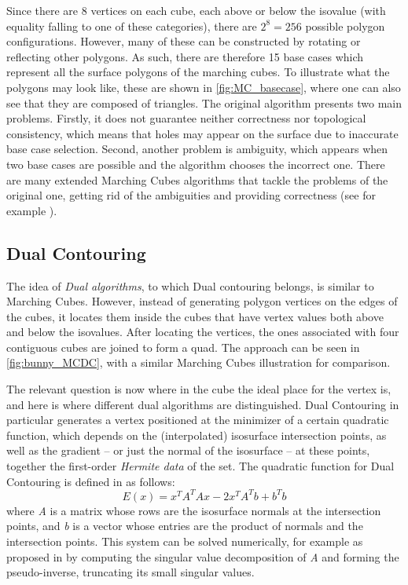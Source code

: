 Since there are 8 vertices on each cube, each above or below the isovalue (with equality falling to one of these categories), there are $2^8=256$ possible polygon configurations. However, many of these can be constructed by rotating or reflecting other polygons. As such, there are therefore 15 base cases which represent all the surface polygons of the marching cubes. To illustrate what the polygons may look like, these are shown in \autoref{fig:MC_basecase}, where one can also see that they are composed of triangles. 
The original algorithm presents two main problems. Firstly, it does not guarantee neither
correctness nor topological consistency, which means that holes may appear on the surface due
to inaccurate base case selection. Second, another problem is ambiguity, which appears when two
base cases are possible and the algorithm chooses the incorrect one. There are many extended Marching Cubes
algorithms that tackle the problems of the original one, getting rid of the ambiguities and
providing correctness (see for example \cite{ExtendedMC}).

\subsection{Dual Contouring}
The idea of \emph{Dual algorithms}, to which Dual contouring belongs, is similar to Marching Cubes. However, instead of generating polygon vertices on the
edges of the cubes, it locates them inside the cubes that have vertex values both above and below the isovalues.
After locating the vertices, the ones associated with four contiguous cubes are joined to form a quad. The approach can be seen in \autoref{fig:bunny_MCDC}, with a similar Marching Cubes illustration for comparison. 

The relevant question is now where in the cube the ideal place for the vertex is, and here is where different dual algorithms are distinguished. Dual Contouring in particular generates a vertex positioned at the minimizer of a
certain quadratic function, which depends on the (interpolated) isosurface intersection points, as well as the gradient -- or just the normal of the isosurface -- at these points, together the first-order \emph{Hermite data} of the set.
The quadratic function for Dual Contouring is defined in \cite{Hermite2002} as follows:
\begin{equation*}
E(x)= x^TA^TAx-2x^TA^Tb+b^Tb
\end{equation*}
where \textit{A} is a matrix whose rows are the isosurface normals at the intersection points, and \textit{b} is a vector whose entries are the product of normals and the intersection points. This system can be solved numerically, for example as proposed in \cite{Hermite2002} by computing the
singular value decomposition of \textit{A} and forming the pseudo-inverse, truncating its small singular values. 


